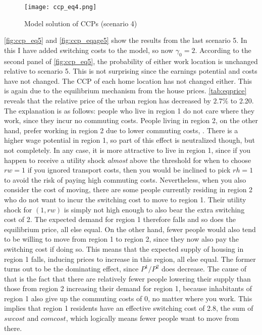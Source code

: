 \begin{figure}
\centering
\texttt{[image: ccp\_eq4.png]} 
\caption{Model solution of CCPs (scenario 4)}
\label{fig:ccp_eq4}
\end{figure}

\autoref{fig:ccp_eq5} and \autoref{fig:ccp_eqage5} show the results from the last scenario 5. In this I have added switching costs to the model, so now $\gamma_0=2$. According to the second panel of \autoref{fig:ccp_eq5}, the probability of either work location is unchanged relative to scenario 5. This is not surprising since the earnings potential and costs have not changed. The CCP of each home location has not changed either. This is again due to the equilibrium mechanism from the house prices. \autoref{tab:eqprice} reveals that the relative price of the urban region has decreased by $2.7\%$ to 2.20. The explanation is as follows: people who live in region 1 do not care where they work, since they incur no commuting costs. People living in region 2, on the other hand, prefer working in region 2 due to lower commuting costs, . There is a higher wage potential in region 1, so part of this effect is neutralized though, but not completely. In any case, it is more attractive to live in region 1, since if you happen to receive a utility shock \textit{almost} above the threshold for when to choose $rw=1$ if you ignored transport costs, then you would be inclined to pick $rh=1$ to avoid the risk of paying high commuting costs. Nevertheless, when you also consider the cost of moving, there are some people currently residing in region 2 who do not want to incur the switching cost to move to region 1. Their utility shock for $(1,rw)$ is simply not high enough to also bear the extra switching cost of 2. The expected demand for region 1 therefore falls and so does the equilibrium price, all else equal. On the other hand, fewer people would also tend to be willing to move from region 1 to region 2, since they now also pay the switching cost if doing so. This means that the expected supply of housing in region 1 falls, inducing prices to increase in this region, all else equal. The former turns out to be the dominating effect, since $P^1/P^2$ does decrease. The cause of that is the fact that there are relatively fewer people lowering their supply than those from region 2 increasing their demand for region 1, because inhabitants of region 1 also give up the commuting costs of 0, no matter where you work. This implies that region 1 residents have an effective switching cost of 2.8, the sum of $swcost$ and $comcost$, which logically means fewer people want to move from there. 
